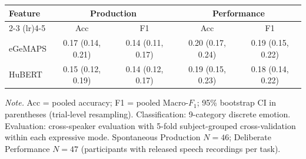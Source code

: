 \begin{tabular}{lcccc}
\toprule
Feature & \multicolumn{2}{c}{Production} & \multicolumn{2}{c}{Performance} \\
\cmidrule(lr){2-3} \cmidrule(lr){4-5}
 & Acc & F1 & Acc & F1 \\
\midrule
eGeMAPS & 0.17 (0.14, 0.21) & 0.14 (0.11, 0.17) & 0.20 (0.17, 0.24) & 0.19 (0.15, 0.22) \\
HuBERT & 0.15 (0.12, 0.19) & 0.14 (0.12, 0.17) & 0.19 (0.15, 0.23) & 0.18 (0.14, 0.22) \\
\bottomrule
\end{tabular}
\par\smallskip\noindent\scriptsize\textit{Note.} Acc = pooled accuracy; F1 = pooled Macro-$F_1$; 95\% bootstrap CI in parentheses (trial-level resampling). Classification: 9-category discrete emotion. Evaluation: cross-speaker evaluation with 5-fold subject-grouped cross-validation within each expressive mode. Spontaneous Production $N=46$; Deliberate Performance $N=47$ (participants with released speech recordings per task).